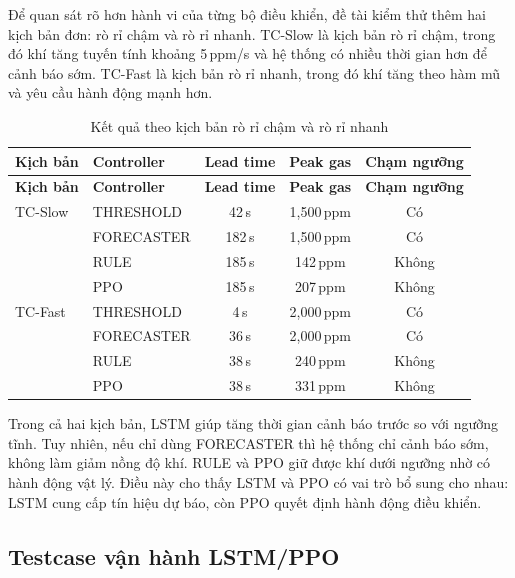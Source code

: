 Để quan sát rõ hơn hành vi của từng bộ điều khiển, đề tài kiểm thử thêm hai kịch bản đơn: rò rỉ chậm và rò rỉ nhanh. TC-Slow là kịch bản rò rỉ chậm, trong đó khí tăng tuyến tính khoảng 5\,ppm/s và hệ thống có nhiều thời gian hơn để cảnh báo sớm. TC-Fast là kịch bản rò rỉ nhanh, trong đó khí tăng theo hàm mũ và yêu cầu hành động mạnh hơn. 

\begingroup
\small
\renewcommand{\arraystretch}{1.25}
\setlength{\tabcolsep}{6pt}
\setlength{\LTleft}{\fill}
\setlength{\LTright}{\fill}

\begin{longtable}{llccc}
\caption{Kết quả theo kịch bản rò rỉ chậm và rò rỉ nhanh}
\label{tab:scenarios_results} \\
\toprule
\textbf{Kịch bản} & \textbf{Controller} & \textbf{Lead time} & \textbf{Peak gas} & \textbf{Chạm ngưỡng} \\
\midrule
\endfirsthead
\toprule
\textbf{Kịch bản} & \textbf{Controller} & \textbf{Lead time} & \textbf{Peak gas} & \textbf{Chạm ngưỡng} \\
\midrule
\endhead
\endfoot
\bottomrule
\endlastfoot
TC-Slow & THRESHOLD  & 42\,s  & 1{,}500\,ppm & Có \\
        & FORECASTER & 182\,s & 1{,}500\,ppm & Có \\
        & RULE       & 185\,s & 142\,ppm     & Không \\
        & PPO        & 185\,s & 207\,ppm     & Không \\
\addlinespace
TC-Fast & THRESHOLD  & 4\,s   & 2{,}000\,ppm & Có \\
        & FORECASTER & 36\,s  & 2{,}000\,ppm & Có \\
        & RULE       & 38\,s  & 240\,ppm     & Không \\
        & PPO        & 38\,s  & 331\,ppm     & Không \\
\end{longtable}
\endgroup

Trong cả hai kịch bản, LSTM giúp tăng thời gian cảnh báo trước so với ngưỡng tĩnh. Tuy nhiên, nếu chỉ dùng FORECASTER thì hệ thống chỉ cảnh báo sớm, không làm giảm nồng độ khí. RULE và PPO giữ được khí dưới ngưỡng nhờ có hành động vật lý. Điều này cho thấy LSTM và PPO có vai trò bổ sung cho nhau: LSTM cung cấp tín hiệu dự báo, còn PPO quyết định hành động điều khiển.

\subsection{Testcase vận hành LSTM/PPO}
\label{sec:four_scenarios}

